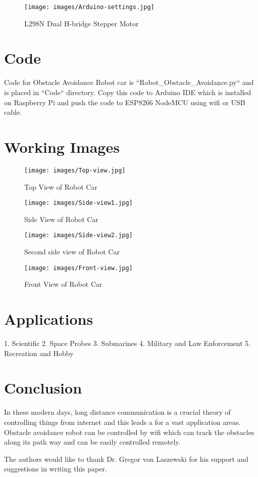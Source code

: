 \documentclass[sigconf]{acmart}
\begin{document}
\begin{figure}
	\texttt{[image: images/Arduino-settings.jpg]}
	\caption{L298N Dual H-bridge Stepper Motor}
\end{figure}

\section{Code}
Code for Obstacle Avoidance Robot car is ``Robot\_Obstacle\_Avoidance.py`` and is placed in ``Code`` directory. Copy this code to Arduino IDE which is installed on Raspberry Pi and push the code to ESP8266 NodeMCU using wifi or USB cable.

\section{Working Images}

\begin{figure}
	\texttt{[image: images/Top-view.jpg]}
	\caption{Top View of Robot Car}
\end{figure}

\begin{figure}
	\texttt{[image: images/Side-view1.jpg]}
	\caption{Side View of Robot Car}
\end{figure}

\begin{figure}
	\texttt{[image: images/Side-view2.jpg]}
	\caption{Second side view of Robot Car}
\end{figure}

\begin{figure}
	\texttt{[image: images/Front-view.jpg]}
	\caption{Front View of Robot Car}
\end{figure}

\section{Applications}
1. Scientific
2. Space Probes
3. Submarines
4. Military and Law Enforcement
5. Recreation and Hobby

\section{Conclusion}
In these modern days, long distance communication is a crucial theory of controlling things from internet and this leads a for a vast application areas. Obstacle avoidance robot can be controlled by wifi which can track the obstacles along its path way and can be easily controlled remotely.

\begin{acks}

The authors would like to thank Dr. Gregor von Laszewski for his support and suggestions in writing this paper.

\end{acks}


 
\end{document}
